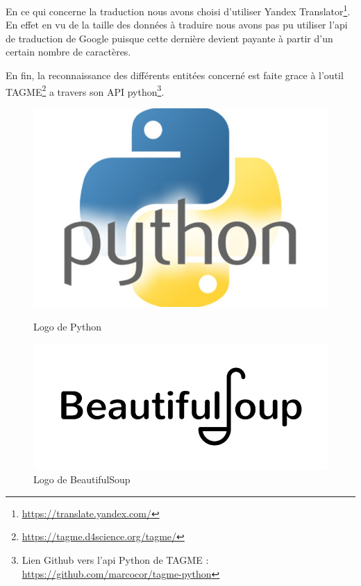 \documentclass[oneside,13pt,a4paper]{report}
\begin{document}
En ce qui concerne la traduction nous avons choisi d'utiliser Yandex Translator\footnote{\url{https://translate.yandex.com/}}. En effet en vu de la taille des données à traduire nous avons pas pu utiliser l'api de traduction de Google puisque cette dernière devient payante à partir d'un certain nombre de caractères.

En fin, la reconnaissance des différents entitées concerné est faite grace à l'outil TAGME\footnote{\url{https://tagme.d4science.org/tagme/}} a travers son API python\footnote{Lien Github vers l'api Python de TAGME : \url{https://github.com/marcocor/tagme-python}}.

\vspace{2cm}
\begin{figure}[h]
	\begin{minipage}[c]{.30\linewidth}
		\centering
		\includegraphics[width=1\textwidth]{img/python.jpg}
		\caption{Logo de Python}
	\end{minipage}
	\hfill%
	\begin{minipage}[c]{.30\linewidth}
		\centering
		\includegraphics[width=1\textwidth]{img/bs.png}
		\caption{Logo de BeautifulSoup}

\end{minipage}
\end{figure}
\end{document}
